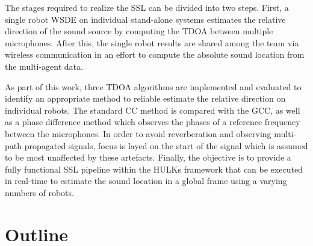 The stages required to realize the \ac{SSL} can be divided into two steps.
First, a single robot \ac{WSDE} on individual stand-alone systems estimates the
relative direction of the sound source by computing the \ac{TDOA} between
multiple microphones. After this, the single robot results are shared among the team
via wireless communication in an effort to compute the absolute sound location
from the multi-agent data.


As part of this work, three \ac{TDOA} algorithms are implemented and evaluated
to identify an appropriate method to reliable estimate the relative direction
on individual robots. The standard \acf{CC} method is compared with the
\acf{GCC}, as well as a phase difference method which observes the phases of a reference
frequency between the microphones. In order to avoid reverberation and
observing multi-path propagated signals, focus is layed on the start of the
signal which is assumed to be most unaffected by these artefacts. Finally, the
objective is to provide a fully functional \ac{SSL} pipeline within the HULKs
framework that can be executed in real-time to estimate the sound location in
a global frame using a varying numbers of robots.


\section{Outline}
\label{sec:01_outline}


